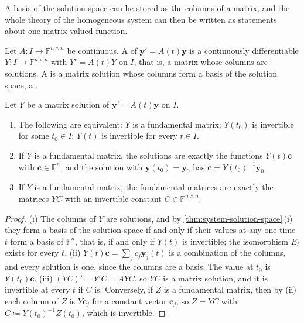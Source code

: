 A basis of the solution space can be stored as the columns of a matrix, and the whole theory of the homogeneous system can then be written as statements about one matrix-valued function.

\begin{definition}
\label{def:fundamental-matrix}
Let $A\colon I\to\mathbb F^{n\times n}$ be continuous. A  of $\mathbf y'=A(t)\mathbf y$ is a continuously differentiable $Y\colon I\to\mathbb F^{n\times n}$ with $Y'=A(t)Y$ on $I$, that is, a matrix whose columns are solutions. A  is a matrix solution whose columns form a basis of the solution space, a .
\end{definition}

\begin{proposition}
\label{prop:fundamental-matrices}
Let $Y$ be a matrix solution of $\mathbf y'=A(t)\mathbf y$ on $I$.
\begin{enumerate}
\item The following are equivalent: $Y$ is a fundamental matrix; $Y(t_0)$ is invertible for some $t_0\in I$; $Y(t)$ is invertible for every $t\in I$.
\item If $Y$ is a fundamental matrix, the solutions are exactly the functions $Y(t)\mathbf c$ with $\mathbf c\in\mathbb F^n$, and the solution with $\mathbf y(t_0)=\mathbf y_0$ has $\mathbf c=Y(t_0)^{-1}\mathbf y_0$.
\item If $Y$ is a fundamental matrix, the fundamental matrices are exactly the matrices $YC$ with an invertible constant $C\in\mathbb F^{n\times n}$.
\end{enumerate}
\end{proposition}

\begin{proof}
(i) The columns of $Y$ are solutions, and by \cref{thm:system-solution-space}\,(i) they form a basis of the solution space if and only if their values at any one time $t$ form a basis of $\mathbb F^n$, that is, if and only if $Y(t)$ is invertible; the isomorphism $E_t$ exists for every $t$. (ii) $Y(t)\mathbf c=\sum_jc_j\mathbf y_j(t)$ is a combination of the columns, and every solution is one, since the columns are a basis. The value at $t_0$ is $Y(t_0)\mathbf c$. (iii) $(YC)'=Y'C=AYC$, so $YC$ is a matrix solution, and it is invertible at every $t$ if $C$ is. Conversely, if $Z$ is a fundamental matrix, then by (ii) each column of $Z$ is $Y\mathbf c_j$ for a constant vector $\mathbf c_j$, so $Z=YC$ with $C\coloneqq Y(t_0)^{-1}Z(t_0)$, which is invertible.
\end{proof}

